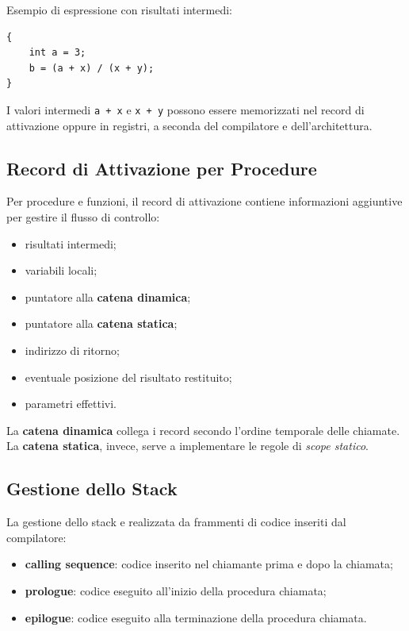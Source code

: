 \documentclass{article}
\begin{document}
Esempio di espressione con risultati intermedi:

\begin{lstlisting}
{
    int a = 3;
    b = (a + x) / (x + y);
}
\end{lstlisting}

I valori intermedi \texttt{a + x} e \texttt{x + y} possono essere memorizzati nel record di attivazione oppure in registri, a seconda del compilatore e dell'architettura.

\subsection{Record di Attivazione per Procedure}

Per procedure e funzioni, il record di attivazione contiene informazioni aggiuntive per gestire il flusso di controllo:

\begin{itemize}
  \item risultati intermedi;
  \item variabili locali;
  \item puntatore alla \textbf{catena dinamica};
  \item puntatore alla \textbf{catena statica};
  \item indirizzo di ritorno;
  \item eventuale posizione del risultato restituito;
  \item parametri effettivi.
\end{itemize}

La \textbf{catena dinamica} collega i record secondo l'ordine temporale delle chiamate. La \textbf{catena statica}, invece, serve a implementare le regole di \textit{scope statico}.

\subsection{Gestione dello Stack}

La gestione dello stack e realizzata da frammenti di codice inseriti dal compilatore:

\begin{itemize}
  \item \textbf{calling sequence}: codice inserito nel chiamante prima e dopo la chiamata;
  \item \textbf{prologue}: codice eseguito all'inizio della procedura chiamata;
  \item \textbf{epilogue}: codice eseguito alla terminazione della procedura chiamata.
\end{itemize}
\end{document}
